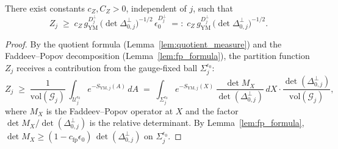 \begin{lemma}
\label{lem:gaussian_lower_Z}
There exist constants $c_{Z},C_{Z}>0$, independent of $j$, such that
\begin{equation}
\label{eq:gaussian_lower_Z}
  Z_{j}\;\ge\;c_{Z}\,g_{\mathrm{YM}}^{D_{j}^{\perp}}\,
  \bigl(\det\Delta_{0,j}^{\perp}\bigr)^{-1/2}\,\epsilon_{0}^{D_{
  j}^{\perp}}\;=:\;c_{Z}\,g_{\mathrm{YM}}^{D_{j}^{\perp}}\,
  \bigl(\det\Delta_{0,j}^{\perp}\bigr)^{-1/2}.
\end{equation}
\end{lemma}

\begin{proof}
By the quotient formula (Lemma~\ref{lem:quotient_measure}) and the
Faddeev--Popov decomposition (Lemma~\ref{lem:fp_formula}), the
partition function $Z_{j}$ receives a contribution from the
gauge-fixed ball $\Sigma_{j}^{\epsilon_{0}}$:
\begin{equation}
\label{eq:Z_decomp}
  Z_{j}\;\ge\;\frac{1}{\mathrm{vol}(\mathcal{G}_{j})}\,
  \int_{\mathcal{U}_{j}^{\epsilon_{0}}}
  e^{-S_{\mathrm{YM},j}(A)}\,dA
  \;=\;\int_{\Sigma_{j}^{\epsilon_{0}}}
  e^{-S_{\mathrm{YM},j}(X)}\,
  \frac{\det M_{X}}{\det(\Delta_{0,j}^{\perp})}\,dX\cdot
  \frac{\det(\Delta_{0,j}^{\perp})}{\mathrm{vol}(\mathcal{G}_{j})},
\end{equation}
where $M_{X}$ is the Faddeev--Popov operator at $X$ and the factor
$\det M_{X}/\det(\Delta_{0,j}^{\perp})$ is the relative determinant.
By Lemma~\ref{lem:fp_formula}, $\det M_{X}\ge
(1-c_{\mathrm{fp}}\epsilon_{0})\,\det(\Delta_{0,j}^{\perp})$ on
$\Sigma_{j}^{\epsilon_{0}}$.


\end{proof}
